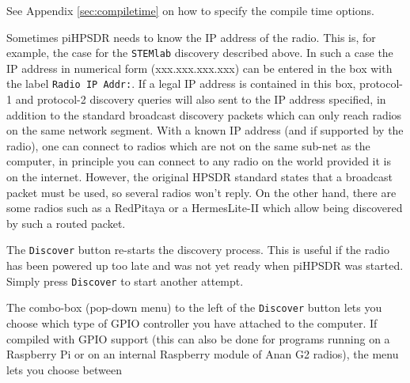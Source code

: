 \documentclass[12pt]{book}
\def\rett#1{\texttt{\color{red}#1}}
\def\pH{pi\-HPSDR\xspace}
\begin{document}
See Appendix \ref{sec:compiletime} on how to specify the compile time options.

Sometimes \pH needs to know the IP address of the radio. This is, for example, the case for the
\texttt{STEMlab} discovery
described above. In such a case the IP address in numerical form (xxx.xxx.xxx.xxx) can be entered in the box
with the label \rett{Radio IP Addr:}. If a legal IP address is contained in this box, protocol-1 and
protocol-2 discovery queries
will also sent to the IP address specified, in addition to the standard broadcast discovery packets which
can only reach
radios on the same network segment. With a known IP address (and if supported by the radio),  one can
connect to radios which are not on the same sub-net as the computer, in principle you can connect to any
radio on the world
provided it is on the internet. However, the original HPSDR standard states that a broadcast packet must be
used, so several
radios won't reply. On the other hand, there are some radios such as a RedPitaya or a HermesLite-II which
allow being discovered by such a routed packet.

The \rett{Discover} button re-starts the discovery process. This is useful if the radio has been powered up
too late and
was not yet ready when \pH was started. Simply press \rett{Discover} to start another attempt.

The combo-box (pop-down menu) to the left of the \rett{Discover} button lets you choose which type of GPIO
controller you
have attached to the computer.  If compiled with GPIO support (this can also be done for
programs running on a Raspberry Pi or on an internal Raspberry module of Anan G2 radios),
the menu lets you choose between
\end{document}
